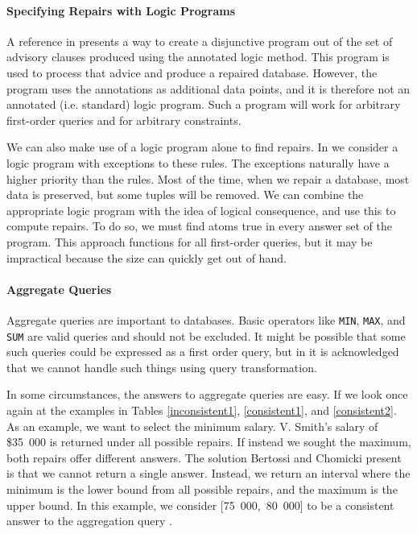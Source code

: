 \documentclass[a4paper]{report}
\begin{document}
\paragraph{Specifying Repairs with Logic Programs}

A reference in \cite{CQ} presents a way to create a disjunctive program out of the set of advisory clauses produced using the annotated logic method. This program is used to process that advice and produce a repaired database. However, the program uses the annotations as additional data points, and it is therefore not an annotated (i.e. standard) logic program. Such a program will work for arbitrary first-order queries and for arbitrary constraints.


We can also make use of a logic program alone to find repairs. In \cite{CQ} we consider a logic program with exceptions to these rules. The exceptions naturally have a higher priority than the rules. Most of the time, when we repair a database, most data is preserved, but some tuples will be removed. We can combine the appropriate logic program with the idea of logical consequence, and use this to compute repairs. To do so, we must find atoms true in every answer set of the program. This approach functions for all first-order queries, but it may be impractical because the size can quickly get out of hand.

\paragraph{Aggregate Queries}

Aggregate queries are important to databases. Basic operators like \texttt{MIN}, \texttt{MAX}, and \texttt{SUM} are valid queries and should not be excluded. It might be possible that some such queries could be expressed as a first order query, but in \cite{CQ} it is acknowledged that we cannot handle such things using query transformation. 

In some circumstances, the answers to aggregate queries are easy. If we look once again at the examples in Tables \ref{inconsistent1}, \ref{consistent1}, and \ref{consistent2}. As an example, we want to select the minimum salary. V. Smith's salary of \$35~000 is returned under all possible repairs. If instead we sought the maximum, both repairs offer different answers. The solution Bertossi and Chomicki present is that we cannot return a single answer. Instead, we return an interval where the minimum is the lower bound from all possible repairs, and the maximum is the upper bound. In this example, we consider [75~000,~80~000] to be a consistent answer to the aggregation query \cite{CQ}. 
\end{document}
